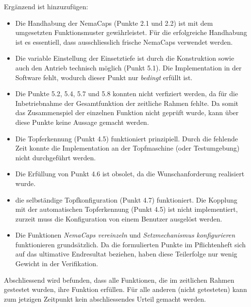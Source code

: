 Ergänzend ist hinzuzufügen:
\begin{itemize}

	\item Die Handhabung der NemaCaps (Punkte 2.1 und 2.2) ist mit dem umgesetzten Funktionsmuster gewährleistet. Für die erfolgreiche Handhabung ist es essentiell, dass ausschliesslich frische NemaCaps verwendet werden. 
	
	\item Die variable Einstellung der Einsetztiefe ist durch die Konstruktion sowie auch den Antrieb technisch möglich (Punkt 5.1). Die Implementation in der Software fehlt, wodurch dieser Punkt nur \textit{bedingt} erfüllt ist.
	
	\item Die Punkte 5.2, 5.4, 5.7 und 5.8 konnten nicht verfiziert werden, da für die Inbetriebnahme der Gesamtfunktion der zeitliche Rahmen fehlte. Da somit das Zusammenspiel der einzelnen Funktion nicht geprüft wurde, kann über diese Punkte keine Aussage gemacht werden.
	
	\item Die Topferkennung (Punkt 4.5) funktioniert prinzipiell. Durch die fehlende Zeit konnte die Implementation an der Topfmaschine (oder Testumgebung) nicht durchgeführt werden.
	
	\item Die Erfüllung von Punkt 4.6 ist obsolet, da die Wunschanforderung realisiert wurde.
	
	\item die selbständige Topfkonfiguration (Punkt 4.7) funktioniert. Die Kopplung mit der automatischen Topferkennung (Punkt 4.5) ist nicht implementiert, zurzeit muss die Konfiguration von einem Benutzer ausgelöst werden.
	
	\item Die Funktionen \textit{NemaCaps vereinzeln} und \textit{Setzmechanismus konfigurieren} funktionieren grundsätzlich. Da die formulierten Punkte im Pflichtenheft sich auf das ultimative Endresultat beziehen, haben diese Teilerfolge nur wenig Gewicht in der Verifikation.
\end{itemize}

Abschliessend wird befunden, dass alle Funktionen, die im zeitlichen Rahmen gestestet wurden, ihre Funktion erfüllen. Für alle anderen (nicht getesteten) kann zum jetzigen Zeitpunkt kein abschliessendes Urteil gemacht werden.